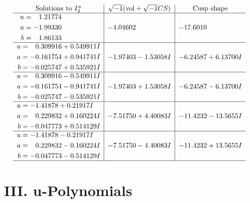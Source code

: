 \documentclass[1p]{elsarticle_modified}
\theoremstyle{definition}
\newcommand{\I}{\sqrt{-1}}
\begin{document}
$$\begin{array}{c|c|c}  
\text{Solutions to }I^u_{2}& \I (\text{vol} + \sqrt{-1}CS) & \text{Cusp shape}\\
 \hline 
\begin{aligned}
u &= \phantom{-}1.21774\phantom{ +0.000000I} \\
a &= -1.99330\phantom{ +0.000000I} \\
b &= \phantom{-}1.86133\phantom{ +0.000000I}\end{aligned}
 & -4.04602\phantom{ +0.000000I} & -17.6010\phantom{ +0.000000I} \\ \hline\begin{aligned}
u &= \phantom{-}0.309916 + 0.549911 I \\
a &= -0.161754 + 0.941741 I \\
b &= -0.025747 + 0.535921 I\end{aligned}
 & -1.97403 - 1.53058 I & -6.24587 + 6.13700 I \\ \hline\begin{aligned}
u &= \phantom{-}0.309916 - 0.549911 I \\
a &= -0.161754 - 0.941741 I \\
b &= -0.025747 - 0.535921 I\end{aligned}
 & -1.97403 + 1.53058 I & -6.24587 - 6.13700 I \\ \hline\begin{aligned}
u &= -1.41878 + 0.21917 I \\
a &= \phantom{-}0.229832 + 0.160224 I \\
b &= -0.047773 + 0.514129 I\end{aligned}
 & -7.51750 + 4.40083 I & -11.4232 - 13.5655 I \\ \hline\begin{aligned}
u &= -1.41878 - 0.21917 I \\
a &= \phantom{-}0.229832 - 0.160224 I \\
b &= -0.047773 - 0.514129 I\end{aligned}
 & -7.51750 - 4.40083 I & -11.4232 + 13.5655 I\\
 \hline 
 \end{array}$$\newpage
\newpage\renewcommand{\arraystretch}{1}
\centering \section*{ III. u-Polynomials}
\end{document}
